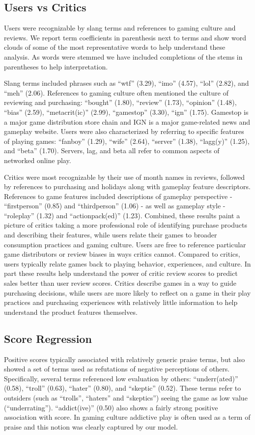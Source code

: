 \documentclass[letterpaper]{article}
\begin{document}
\subsection{Users vs Critics}
Users were recognizable by slang terms and references to gaming culture and reviews. We report term coefficients in parenthesis next to terms and show word clouds of some of the most representative words to help understand these analysis. As words were stemmed we have included completions of the stems in parentheses to help interpretation.

Slang terms included phrases such as ``wtf'' (3.29), ``imo'' (4.57), ``lol'' (2.82), and ``meh'' (2.06). References to gaming culture often mentioned the culture of reviewing and purchasing: ``bought'' (1.80), ``review'' (1.73), ``opinion'' (1.48), ``bias'' (2.59), ``metacrit(ic)'' (2.99), ``gamestop'' (3.30), ``ign'' (1.75). Gamestop is a major game distribution store chain and IGN is a major game-related news and gameplay website. Users were also characterized by referring to specific features of playing games: ``fanboy'' (1.29), ``wife'' (2.64), ``server'' (1.38), ``lagg(y)'' (1.25), and ``beta'' (1.70). Servers, lag, and beta all refer to common aspects of networked online play.

Critics were most recognizable by their use of month names in reviews, followed by references to purchasing and holidays along with gameplay feature descriptors. References to game features included descriptions of gameplay perspective - ``firstperson'' (0.85) and ``thirdperson'' (1.06) - as well as gameplay style - ``roleplay'' (1.32) and ``actionpack(ed)'' (1.23).
Combined, these results paint a picture of critics taking a more professional role of identifying purchase products and describing their features, while users relate their games to broader consumption practices and gaming culture. Users are free to reference particular game distributors or review biases in ways critics cannot. Compared to critics, users typically relate games back to playing behavior, experiences, and culture. In part these results help understand the power of critic review scores to predict sales better than user review scores. Critics describe games in a way to guide purchasing decisions, while users are more likely to reflect on a game in their play practices and purchasing experiences with relatively little information to help understand the product features themselves.

\subsection{Score Regression}
Positive scores typically associated with relatively generic praise terms, but also showed a set of terms used as refutations of negative perceptions of others. Specifically, several terms referenced low evaluation by others: ``underr(ated)'' (0.58), ``troll'' (0.63), ``hater'' (0.80), and ``skeptic'' (0.52). These terms refer to outsiders (such as ``trolls'', ``haters'' and ``skeptics'') seeing the game as low value (``underrating''). ``addict(ive)'' (0.50) also shows a fairly strong positive association with score. In gaming culture addictive play is often used as a term of praise and this notion was clearly captured by our model.
\end{document}
